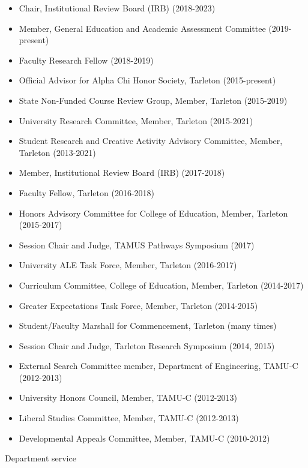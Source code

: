 \documentclass[article,10pt]{article}
\begin{document}
\begin{itemize}
\item Chair, Institutional Review Board (IRB) (2018-2023)
\item Member, General Education and Academic Assessment Committee (2019-present)
\item Faculty Research Fellow (2018-2019)
\item Official Advisor for Alpha Chi Honor Society, Tarleton (2015-present)
\item State Non-Funded Course Review Group, Member, Tarleton (2015-2019)
\item University Research Committee, Member, Tarleton (2015-2021)
\item Student Research and Creative Activity Advisory Committee, Member, Tarleton (2013-2021)
\item Member, Institutional Review Board (IRB) (2017-2018)
\item Faculty Fellow, Tarleton (2016-2018)
\item Honors Advisory Committee for College of Education, Member, Tarleton (2015-2017)
\item Session Chair and Judge, TAMUS Pathways Symposium (2017)
\item University ALE Task Force, Member, Tarleton (2016-2017)
\item Curriculum Committee, College of Education, Member, Tarleton (2014-2017)
\item Greater Expectations Task Force, Member, Tarleton (2014-2015)
\item Student/Faculty Marshall for Commencement, Tarleton (many times)
\item Session Chair and Judge, Tarleton Research Symposium (2014, 2015)
\item External Search Committee member, Department of Engineering, TAMU-C (2012-2013)
\item University Honors Council, Member, TAMU-C (2012-2013)
\item Liberal Studies Committee, Member, TAMU-C (2012-2013)
\item Developmental Appeals Committee, Member, TAMU-C (2010-2012)
\end{itemize}

Department service
\end{document}
